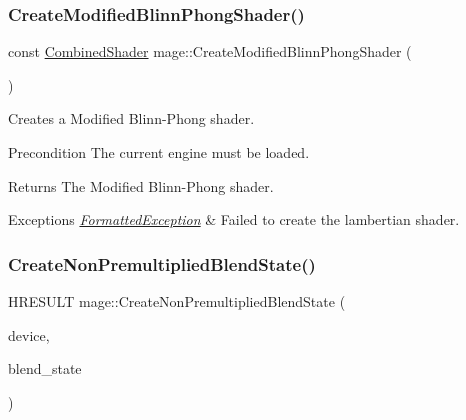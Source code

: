 \subsubsection{\texorpdfstring{Create\+Modified\+Blinn\+Phong\+Shader()}{CreateModifiedBlinnPhongShader()}}
{\footnotesize\ttfamily const \hyperlink{structmage_1_1_combined_shader}{Combined\+Shader} mage\+::\+Create\+Modified\+Blinn\+Phong\+Shader (\begin{DoxyParamCaption}{ }\end{DoxyParamCaption})}

Creates a Modified Blinn-\/\+Phong shader.

\begin{DoxyPrecond}{Precondition}
The current engine must be loaded. 
\end{DoxyPrecond}
\begin{DoxyReturn}{Returns}
The Modified Blinn-\/\+Phong shader. 
\end{DoxyReturn}

\begin{DoxyExceptions}{Exceptions}
{\em \hyperlink{structmage_1_1_formatted_exception}{Formatted\+Exception}} & Failed to create the lambertian shader. \\
\hline
\end{DoxyExceptions}
\hypertarget{namespacemage_a6f4e37e4b8092acec9dad9a8b24ebb07}{}\label{namespacemage_a6f4e37e4b8092acec9dad9a8b24ebb07} 
\subsubsection{\texorpdfstring{Create\+Non\+Premultiplied\+Blend\+State()}{CreateNonPremultipliedBlendState()}}
{\footnotesize\ttfamily H\+R\+E\+S\+U\+LT mage\+::\+Create\+Non\+Premultiplied\+Blend\+State (\begin{DoxyParamCaption}\item[{I\+D3\+D11\+Device2 $\ast$}]{device,  }\item[{I\+D3\+D11\+Blend\+State $\ast$$\ast$}]{blend\+\_\+state }\end{DoxyParamCaption})}

\hypertarget{namespacemage_ab2f30a0ab5f75edd279091ee24bc7811}{}\label{namespacemage_ab2f30a0ab5f75edd279091ee24bc7811} 

